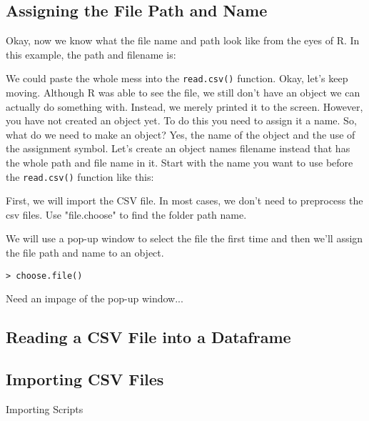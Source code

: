 \documentclass{article}\usepackage[]{graphicx}\usepackage[]{color}
\begin{document}
\subsection{Assigning the File Path and Name}

Okay, now we know what the file name and path look like from the eyes of R. In this example, the path and filename is:


We could paste the whole mess into the \texttt{read.csv()} function. Okay, let's keep moving. Although R was able to see the file, we still don't have an object we can actually do something with. Instead, we merely printed it to the screen. However, you have not created an object yet. To do this you need to assign it a name. So, what do we need to make an object?  Yes, the name of the object and the use of the assignment symbol. Let's create an object names filename instead that has the whole path and file name in it. Start with the name you want to use before the \texttt{read.csv()} function like this:

First, we will import the CSV file. In most cases, we don't need to preprocess the csv files. Use "file.choose" to find the folder path name. 

We will use a pop-up window to select the file the first time and then we'll assign the file path and name to an object. 

\begin{verbatim}
> choose.file()
\end{verbatim}

Need an impage of the pop-up window...

\subsection{Reading a CSV File into a Dataframe}


\subsection{Importing CSV Files}


Importing Scripts
\end{document}
